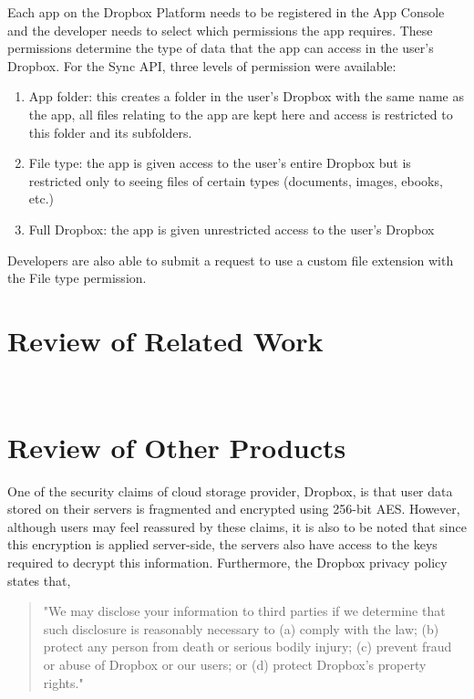 Each app on the Dropbox Platform needs to be registered in the App Console and the developer needs to select which permissions the app requires. These permissions determine the type of data that the app can access in the user's Dropbox.  For the Sync API, three levels of permission were available:
\begin{enumerate}
\item App folder:  this creates a folder in the user's Dropbox with the same name as the app, all files relating to the app are kept here and access is restricted to this folder and its subfolders.
\item File type: the app is given access to the user's entire Dropbox but is restricted only to seeing files of certain types (documents, images, ebooks, etc.)  
\item Full Dropbox:  the app is given unrestricted access to the user's Dropbox
\end{enumerate}
Developers are also able to submit a request to use a custom file extension with the File type permission.


\section{Review of Related Work }
\label{sec:agke}
\\

\section{Review of Other Products}

One of the security claims of cloud storage provider, Dropbox, is that user data stored on their servers is  fragmented and encrypted using 256-bit AES.  However, although users may feel reassured by these claims, it is also to be noted that since this encryption is applied server-side, the servers also have access to the keys required to decrypt this information.  Furthermore, the   Dropbox privacy policy states that,  
\begin{quotation}
"We may disclose your information to third parties if we determine that such disclosure is reasonably necessary to (a) comply with the law; (b) protect any person from death or serious bodily injury; (c) prevent fraud or abuse of Dropbox or our users; or (d) protect Dropbox's property rights." 
\end{quotation} 

